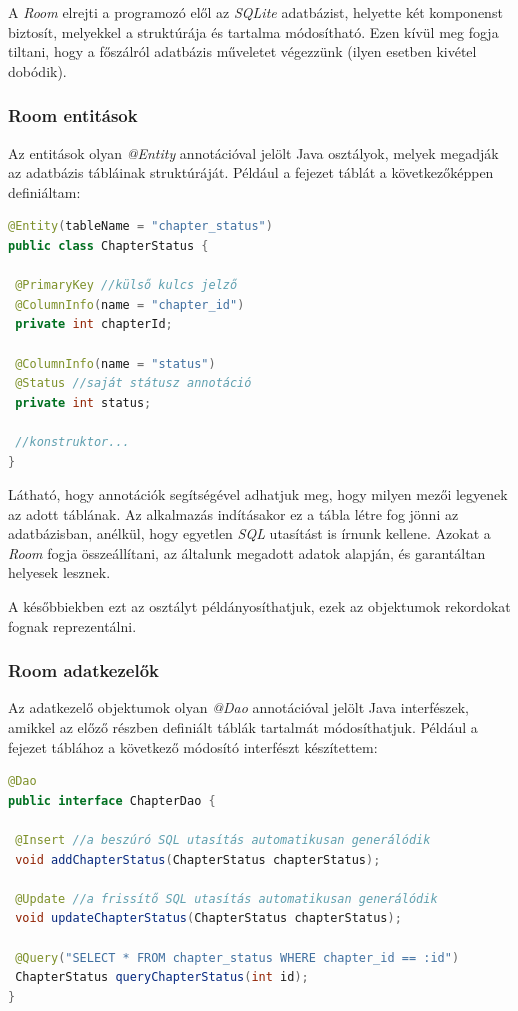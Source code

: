 \documentclass[12pt,a4paper]{article}
\begin{document}
	A \textit{Room} elrejti a programozó elől az \textit{SQLite} adatbázist, helyette két komponenst biztosít, melyekkel a struktúrája és tartalma módosítható. Ezen kívül meg fogja tiltani, hogy a főszálról adatbázis műveletet végezzünk (ilyen esetben kivétel dobódik). 
	
	\subsubsection{Room entitások}
	
	Az entitások olyan \textit{@Entity} annotációval jelölt Java osztályok, melyek megadják az adatbázis tábláinak struktúráját. Például a fejezet táblát a következőképpen definiáltam:
	
	\begin{lstlisting}[language=Java]
@Entity(tableName = "chapter_status")
public class ChapterStatus {
	
 @PrimaryKey //külső kulcs jelző
 @ColumnInfo(name = "chapter_id")
 private int chapterId;
	
 @ColumnInfo(name = "status")
 @Status //saját státusz annotáció
 private int status;
 
 //konstruktor...
}
	\end{lstlisting}  
	
	Látható, hogy annotációk segítségével adhatjuk meg, hogy milyen mezői legyenek az adott táblának. Az alkalmazás indításakor ez a tábla létre fog jönni az adatbázisban, anélkül, hogy egyetlen \textit{SQL} utasítást is írnunk kellene. Azokat a \textit{Room} fogja összeállítani, az általunk megadott adatok alapján, és garantáltan helyesek lesznek.
	
	A későbbiekben ezt az osztályt példányosíthatjuk, ezek az objektumok rekordokat fognak reprezentálni.

	\subsubsection{Room adatkezelők}
	
	Az adatkezelő objektumok olyan \textit{@Dao} annotációval jelölt Java interfészek, amikkel az előző részben definiált táblák tartalmát módosíthatjuk. Például a fejezet táblához a következő módosító interfészt készítettem:
	
	\begin{lstlisting}[language=Java]
@Dao
public interface ChapterDao {
	
 @Insert //a beszúró SQL utasítás automatikusan generálódik
 void addChapterStatus(ChapterStatus chapterStatus);
	
 @Update //a frissítő SQL utasítás automatikusan generálódik
 void updateChapterStatus(ChapterStatus chapterStatus);
	
 @Query("SELECT * FROM chapter_status WHERE chapter_id == :id")
 ChapterStatus queryChapterStatus(int id);
}
	\end{lstlisting}
\end{document}
